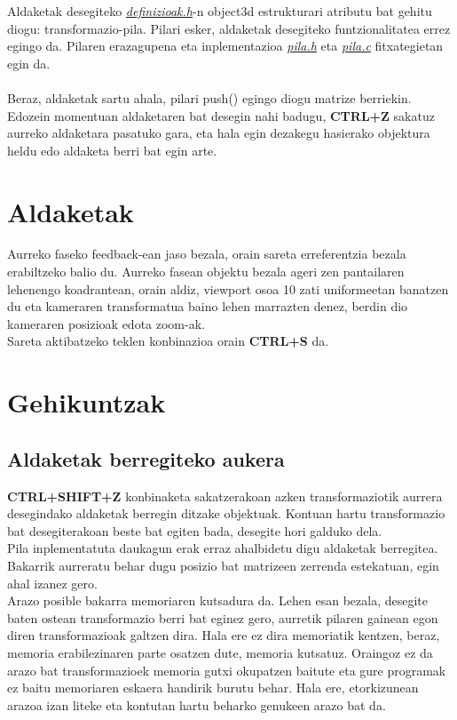 \documentclass[12pt]{article}
\newcommand{\fitxategi}[1] {\underline{\textit{#1}}}
\newcommand{\tekla}[1] {\textbf{#1}}
\begin{document}
Aldaketak desegiteko \fitxategi{definizioak.h}-n object3d estrukturari atributu bat gehitu diogu: transformazio-pila. Pilari esker, aldaketak desegiteko funtzionalitatea errez egingo da.
Pilaren erazagupena eta inplementazioa \fitxategi{pila.h} eta \fitxategi{pila.c} fitxategietan egin da.\\\\
Beraz, aldaketak sartu ahala, pilari push() egingo diogu matrize berriekin. Edozein momentuan aldaketaren bat desegin nahi badugu, \tekla{CTRL+Z} sakatuz aurreko aldaketara pasatuko gara, eta hala egin dezakegu hasierako objektura heldu edo aldaketa berri bat egin arte.

\section{Aldaketak}

Aurreko faseko feedback-ean jaso bezala, orain sareta erreferentzia bezala erabiltzeko balio du. Aurreko fasean objektu bezala ageri zen pantailaren lehenengo koadrantean, orain aldiz, viewport\cite{viewport} osoa 10 zati uniformeetan banatzen du eta kameraren transformatua baino lehen marrazten denez, berdin dio kameraren posizioak edota zoom-ak.\\
Sareta aktibatzeko teklen konbinazioa orain \tekla{CTRL+S} da.


\section{Gehikuntzak}

\subsection{Aldaketak berregiteko aukera}

\tekla{CTRL+SHIFT+Z} konbinaketa sakatzerakoan azken transformaziotik aurrera desegindako aldaketak berregin ditzake objektuak. Kontuan hartu transformazio bat desegiterakoan beste bat egiten bada, desegite hori galduko dela.\\
Pila inplementatuta daukagun erak erraz ahalbidetu digu aldaketak berregitea. Bakarrik aurreratu behar dugu posizio bat matrizeen zerrenda estekatuan, egin ahal izanez gero.\\

Arazo posible bakarra memoriaren kutsadura da. Lehen esan bezala, desegite baten ostean transformazio berri bat eginez gero, aurretik pilaren gainean egon diren transformazioak galtzen dira. Hala ere ez dira memoriatik kentzen, beraz, memoria erabilezinaren parte osatzen dute, memoria kutsatuz. Oraingoz ez da arazo bat transformazioek memoria gutxi okupatzen baitute eta gure programak ez baitu memoriaren eskaera handirik burutu behar. Hala ere, etorkizunean arazoa izan liteke eta kontutan hartu beharko genukeen arazo bat da.
\end{document}
